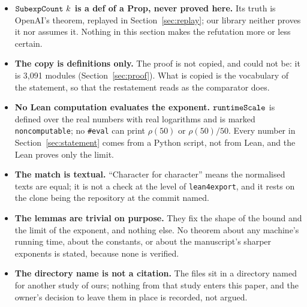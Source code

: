 \begin{itemize}
\item \textbf{\(\texttt{SubexpCount}\ k\) is a def of a Prop, never proved
  here.} Its truth is OpenAI's theorem, replayed in
  Section~\ref{sec:replay}; our library neither proves it nor assumes
  it. Nothing in this section makes the refutation more or less certain.
\item \textbf{The copy is definitions only.} The proof is not copied,
  and could not be: it is 3,091 modules (Section~\ref{sec:proof}). What
  is copied is the vocabulary of the statement, so that the restatement
  reads as the comparator does.
\item \textbf{No Lean computation evaluates the exponent.}
  $\texttt{runtimeScale}$ is defined over the real numbers with real logarithms
  and is marked \texttt{noncomputable}; no \texttt{\#eval} can print
  $\rho(50)$ or $\rho(50)/50$. Every number in
  Section~\ref{sec:statement} comes from a Python script, not from
  Lean, and the Lean proves only the limit.
\item \textbf{The match is textual.} ``Character for character'' means
  the normalised texts are equal; it is not a check at the level of
  \texttt{lean4export}, and it rests on the clone being the repository
  at the commit named.
\item \textbf{The lemmas are trivial on purpose.} They fix the shape of
  the bound and the limit of the exponent, and nothing else. No theorem
  about any machine's running time, about the constants, or about the
  manuscript's sharper exponents is stated, because none is verified.
\item \textbf{The directory name is not a citation.} The files sit in a
  directory named for another study of ours; nothing from that study
  enters this paper, and the owner's decision to leave them in place is
  recorded, not argued.
\end{itemize}
\endgroup
